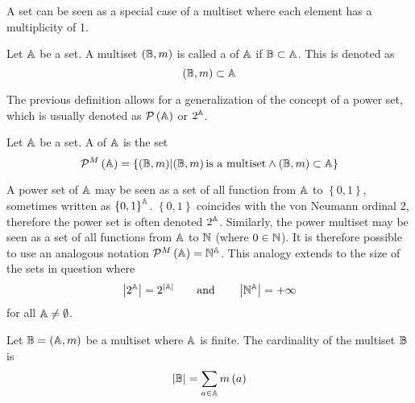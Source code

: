 \begin{remark}
	A set can be seen as a special case of a multiset where each element has a multiplicity of 1.
\end{remark}

\begin{define}
	Let \( \mathbb{A} \) be a set. A multiset \( \left( \mathbb{B}, m \right) \) is called a  of \( \mathbb{A} \) if \( \mathbb{B} \subset \mathbb{A} \). This is denoted as
	\[ \left( \mathbb{B}, m \right) \subset \mathbb{A} \]
\end{define}

The previous definition allows for a generalization of the concept of a power set, which is usually denoted as \( \mathcal{P} \left( \mathbb{A} \right) \) or \( 2^{\mathbb{A}} \).

\begin{define}
	Let \( \mathbb{A} \) be a set. A  of \( \mathbb{A} \) is the set
	\[ \mathcal{P}^M \left( \mathbb{A} \right) = \left\{ \left( \mathbb{B}, m \right) \middle| \left( \mathbb{B}, m \right) \text{is a multiset} \wedge \left( \mathbb{B}, m \right) \subset \mathbb{A} \right\} \]
\end{define}

\begin{remark}
	A power set of \( \mathbb{A} \) may be seen as a set of all function from \( \mathbb{A} \) to \( \left\{ 0, 1 \right\} \), sometimes written as \( \left\{ 0, 1 \right\}^{\mathbb{A}} \). \( \left\{ 0, 1 \right\} \) coincides with the von Neumann ordinal 2, therefore the power set is often denoted \( 2^{\mathbb{A}} \). Similarly, the power multiset may be seen as a set of all functions from \( \mathbb{A} \) to \( \mathbb{N} \) (where \( 0 \in \mathbb{N} \)). It is therefore possible to use an analogous notation \( \mathcal{P}^M \left( \VUset{A} \right) = \VUfield{N}^\VUset{A} \). This analogy extends to the size of the sets in question where
	\[ \left\lvert 2^{\VUset{A}} \right\rvert = 2^{\left\lvert \VUset{A} \right\rvert} \qquad \text{and} \qquad \left\lvert \VUfield{N}^\VUset{A} \right\rvert = + \infty \]
	for all \( \mathbb{A} \neq \emptyset \).
\end{remark}

\begin{define}
	Let \( \mathbb{B} = \left( \mathbb{A}, m \right) \) be a multiset where \( \mathbb{A} \) is finite. The cardinality of the multiset \( \mathbb{B} \) is
	\[ \left\lvert \mathbb{B} \right\rvert = \sum_{a \in \mathbb{A}} m \left( a \right) \]
\end{define}

